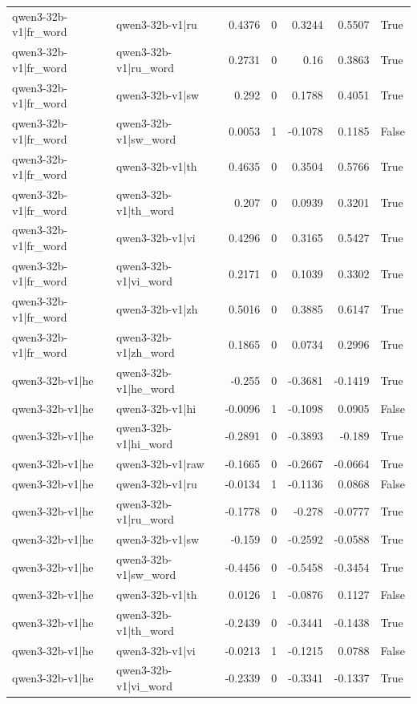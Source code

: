 \begin{table}
\begin{tabular}{l l r r r r l}
qwen3-32b-v1|fr_word & qwen3-32b-v1|ru & 0.4376 & 0 & 0.3244 & 0.5507 & True \\
qwen3-32b-v1|fr_word & qwen3-32b-v1|ru_word & 0.2731 & 0 & 0.16 & 0.3863 & True \\
qwen3-32b-v1|fr_word & qwen3-32b-v1|sw & 0.292 & 0 & 0.1788 & 0.4051 & True \\
qwen3-32b-v1|fr_word & qwen3-32b-v1|sw_word & 0.0053 & 1 & -0.1078 & 0.1185 & False \\
qwen3-32b-v1|fr_word & qwen3-32b-v1|th & 0.4635 & 0 & 0.3504 & 0.5766 & True \\
qwen3-32b-v1|fr_word & qwen3-32b-v1|th_word & 0.207 & 0 & 0.0939 & 0.3201 & True \\
qwen3-32b-v1|fr_word & qwen3-32b-v1|vi & 0.4296 & 0 & 0.3165 & 0.5427 & True \\
qwen3-32b-v1|fr_word & qwen3-32b-v1|vi_word & 0.2171 & 0 & 0.1039 & 0.3302 & True \\
qwen3-32b-v1|fr_word & qwen3-32b-v1|zh & 0.5016 & 0 & 0.3885 & 0.6147 & True \\
qwen3-32b-v1|fr_word & qwen3-32b-v1|zh_word & 0.1865 & 0 & 0.0734 & 0.2996 & True \\
qwen3-32b-v1|he & qwen3-32b-v1|he_word & -0.255 & 0 & -0.3681 & -0.1419 & True \\
qwen3-32b-v1|he & qwen3-32b-v1|hi & -0.0096 & 1 & -0.1098 & 0.0905 & False \\
qwen3-32b-v1|he & qwen3-32b-v1|hi_word & -0.2891 & 0 & -0.3893 & -0.189 & True \\
qwen3-32b-v1|he & qwen3-32b-v1|raw & -0.1665 & 0 & -0.2667 & -0.0664 & True \\
qwen3-32b-v1|he & qwen3-32b-v1|ru & -0.0134 & 1 & -0.1136 & 0.0868 & False \\
qwen3-32b-v1|he & qwen3-32b-v1|ru_word & -0.1778 & 0 & -0.278 & -0.0777 & True \\
qwen3-32b-v1|he & qwen3-32b-v1|sw & -0.159 & 0 & -0.2592 & -0.0588 & True \\
qwen3-32b-v1|he & qwen3-32b-v1|sw_word & -0.4456 & 0 & -0.5458 & -0.3454 & True \\
qwen3-32b-v1|he & qwen3-32b-v1|th & 0.0126 & 1 & -0.0876 & 0.1127 & False \\
qwen3-32b-v1|he & qwen3-32b-v1|th_word & -0.2439 & 0 & -0.3441 & -0.1438 & True \\
qwen3-32b-v1|he & qwen3-32b-v1|vi & -0.0213 & 1 & -0.1215 & 0.0788 & False \\
qwen3-32b-v1|he & qwen3-32b-v1|vi_word & -0.2339 & 0 & -0.3341 & -0.1337 & True \\

\end{tabular}
\end{table}
